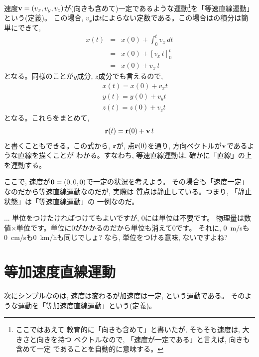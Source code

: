 速度${\bf v}=(v_x, v_y, v_z)$が(向きも含めて)一定であるような運動\footnote{ここではあえて
教育的に「向きも含めて」と書いたが, そもそも速度は, 大きさと向きを持つ
ベクトルなので, 「速度が一定である」と言えば, 向きも含めて一定
であることを自動的に意味する。}を「等速直線運動」という(定義)。
この場合, $v_x$は$t$によらない定数である。この場合はの積分は簡単にできて, 
\begin{eqnarray}
x(t)&=&x(0)+\int_{0}^{t}v_x\, dt\nonumber\\
&=&x(0)+[v_x\,t]_{0}^{t}\nonumber\\
&=&x(0)+v_x\,t
\end{eqnarray}
となる。同様のことが$y$成分, $z$成分でも言えるので, 
\begin{eqnarray}
&&x(t)=x(0)+v_xt\label{eq:constantvelocity_x}\\
&&y(t)=y(0)+v_yt\label{eq:constantvelocity_y}\\
&&z(t)=z(0)+v_zt\label{eq:constantvelocity_z}
\end{eqnarray}
となる。これらをまとめて, 
\begin{eqnarray}
{\bf r}(t)={\bf r}(0)+{\bf v}\,t
\end{eqnarray}
と書くこともできる。この式から, 
${\bf r}$が, 点${\bf r}(0)$を通り, 方向ベクトルが${\bf v}$であるような直線を描くことが
わかる。すなわち, 等速直線運動は, 確かに「直線」の上を運動する。\mv

ここで, 速度が${\bf 0}=(0, 0, 0)$で一定の状況を考えよう。
その場合も「速度一定」なのだから等速直線運動なのだが, 実際は
質点は静止している。つまり, 「静止状態」は「等速直線運動」の
一例なのだ。\mv

\begin{faq}{\small{}
... 単位をつけたければつけてもよいですが, 0には単位は不要です。
物理量は数値$\times$単位です。単位に0がかかるのだから単位も消えて0です。
それに, 0~m/sも0~cm/sも0~km/hも同じでしょ? なら, 単位をつける意味, ないですよね?
}\end{faq}
\hv


\section{等加速度直線運動}\label{sect:const_accel}

次にシンプルなのは, 速度は変わるが加速度は一定, という運動である。
そのような運動を「等加速度直線運動」という(定義)。

